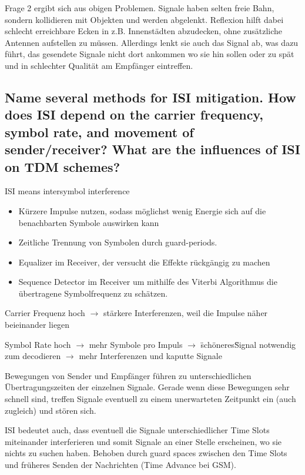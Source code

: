 Frage 2 ergibt sich aus obigen Problemen. Signale haben selten freie Bahn, sondern kollidieren mit Objekten und werden abgelenkt.
Reflexion hilft dabei schlecht erreichbare Ecken in z.B. Innenstädten abzudecken, ohne zusätzliche Antennen aufstellen zu müssen. Allerdings lenkt sie auch das Signal ab, was dazu führt, das gesendete Signale nicht dort ankommen wo sie hin sollen oder zu spät und in schlechter Qualität am Empfänger eintreffen.

\subsection{Name several methods for ISI mitigation. How does ISI depend on the carrier
frequency, symbol rate, and movement of sender/receiver? What are the influences
of ISI on TDM schemes?}
ISI means intersymbol interference

\begin{itemize}

\item Kürzere Impulse nutzen, sodass möglichst wenig Energie sich auf die benachbarten Symbole auswirken kann

\item Zeitliche Trennung von Symbolen durch guard-periods. 

\item Equalizer im Receiver, der versucht die Effekte rückgängig zu machen

\item Sequence Detector im Receiver um mithilfe des Viterbi Algorithmus die übertragene Symbolfrequenz zu schätzen.

\end{itemize}

Carrier Frequenz hoch $\rightarrow$ stärkere Interferenzen, weil die Impulse näher beieinander liegen

Symbol Rate hoch $\rightarrow$ mehr Symbole pro Impuls $\rightarrow$ \"schöneres\" Signal notwendig zum decodieren $\rightarrow$ mehr Interferenzen und kaputte Signale

Bewegungen von Sender und Empfänger führen zu unterschiedlichen Übertragungszeiten der einzelnen Signale. Gerade wenn diese Bewegungen sehr schnell sind, treffen Signale eventuell zu einem unerwarteten Zeitpunkt ein (auch zugleich) und stören sich.

ISI bedeutet auch, dass eventuell die Signale unterschiedlicher Time Slots miteinander interferieren und somit Signale an einer Stelle erscheinen, wo sie nichts zu suchen haben. Behoben durch guard spaces zwischen den Time Slots und früheres Senden der Nachrichten (Time Advance bei GSM).


